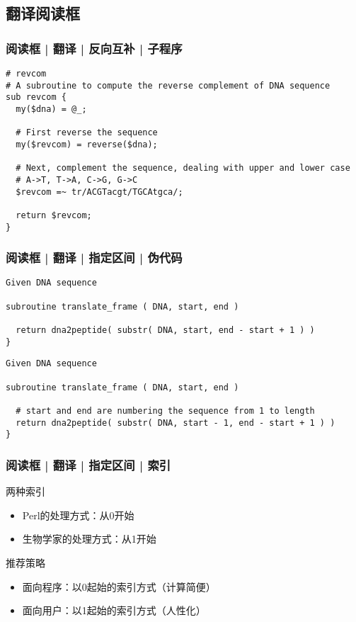 \subsection{翻译阅读框}
\begin{frame}[fragile]
  \frametitle{阅读框 | 翻译 | 反向互补 | 子程序}
\begin{lstlisting}
# revcom 
# A subroutine to compute the reverse complement of DNA sequence
sub revcom {
  my($dna) = @_;

  # First reverse the sequence
  my($revcom) = reverse($dna);

  # Next, complement the sequence, dealing with upper and lower case
  # A->T, T->A, C->G, G->C
  $revcom =~ tr/ACGTacgt/TGCAtgca/;

  return $revcom;
}
\end{lstlisting}
\end{frame}

\begin{frame}[fragile]
  \frametitle{阅读框 | 翻译 | 指定区间 | 伪代码}
\begin{lstlisting}[basicstyle=\footnotesize\tt,numberstyle=\scriptsize]
Given DNA sequence

subroutine translate_frame ( DNA, start, end )

  return dna2peptide( substr( DNA, start, end - start + 1 ) )
}
\end{lstlisting}
\pause
\begin{lstlisting}[basicstyle=\footnotesize\tt,numberstyle=\scriptsize]
Given DNA sequence

subroutine translate_frame ( DNA, start, end )

  # start and end are numbering the sequence from 1 to length
  return dna2peptide( substr( DNA, start - 1, end - start + 1 ) )
}
\end{lstlisting}
\end{frame}

\begin{frame}[fragile]
  \frametitle{阅读框 | 翻译 | 指定区间 | \alert{索引}}
  \begin{block}{两种索引}
    \begin{itemize}
      \item Perl的处理方式：从0开始
      \item 生物学家的处理方式：从1开始
    \end{itemize}
  \end{block}
  \pause
  \begin{block}{推荐策略}
    \begin{itemize}
      \item 面向程序：以0起始的索引方式（计算简便）
      \item 面向用户：以1起始的索引方式（人性化）
    \end{itemize}
  \end{block}
\end{frame}

